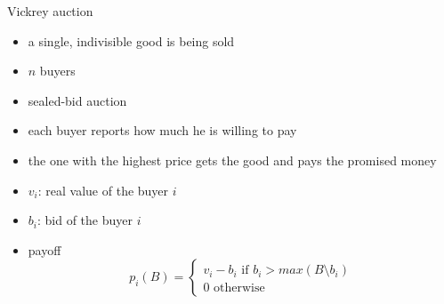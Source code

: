 \documentclass{beamer}
\begin{document}
\begin{frame}{Vickrey auction}
  \begin{itemize}
    \item a single, indivisible good is being sold
    \item $n$ buyers
    \item sealed-bid auction
    \item each buyer reports how much he is willing to pay
    \item<2-> the one with the highest price gets the good and pays
      the promised money
    \item<3-> $v_i$: real value of the buyer $i$
    \item<4-> $b_i$: bid of the buyer $i$
    \item<5-> payoff
\[
p_i(B) = \left \{
  \begin{array}{l}
    v_i - b_i \mbox{ if } b_i > max(B \setminus b_i)\\
    0         \mbox{ otherwise }
  \end{array}
\right .
\]
  \end{itemize}
\end{frame}
\end{document}
